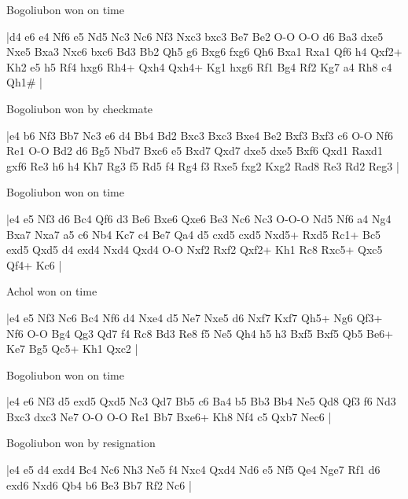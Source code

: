 Bogoliubon won on time

\makegametitle
|d4 e6 e4 Nf6 e5 Nd5 Nc3 Nc6 Nf3 Nxc3 bxc3 Be7 Be2 O-O O-O d6 Ba3 dxe5 Nxe5 Bxa3 Nxc6 bxc6 Bd3 Bb2 Qh5 g6 Bxg6 fxg6 Qh6 Bxa1 Rxa1 Qf6 h4 Qxf2+ Kh2 e5 h5 Rf4 hxg6 Rh4+ Qxh4 Qxh4+ Kg1 hxg6 Rf1 Bg4 Rf2 Kg7 a4 Rh8 c4 Qh1\#  |

\showboard

Bogoliubon won by checkmate

\makegametitle
|e4 b6 Nf3 Bb7 Nc3 e6 d4 Bb4 Bd2 Bxc3 Bxc3 Bxe4 Be2 Bxf3 Bxf3 c6 O-O Nf6 Re1 O-O Bd2 d6 Bg5 Nbd7 Bxc6 e5 Bxd7 Qxd7 dxe5 dxe5 Bxf6 Qxd1 Raxd1 gxf6 Re3 h6 h4 Kh7 Rg3 f5 Rd5 f4 Rg4 f3 Rxe5 fxg2 Kxg2 Rad8 Re3 Rd2 Reg3  |

\showboard

Bogoliubon won on time

\makegametitle
|e4 e5 Nf3 d6 Bc4 Qf6 d3 Be6 Bxe6 Qxe6 Be3 Nc6 Nc3 O-O-O Nd5 Nf6 a4 Ng4 Bxa7 Nxa7 a5 c6 Nb4 Kc7 c4 Be7 Qa4 d5 cxd5 cxd5 Nxd5+ Rxd5 Rc1+ Bc5 exd5 Qxd5 d4 exd4 Nxd4 Qxd4 O-O Nxf2 Rxf2 Qxf2+ Kh1 Rc8 Rxc5+ Qxc5 Qf4+ Kc6  |

\showboard

Achol won on time

\makegametitle
|e4 e5 Nf3 Nc6 Bc4 Nf6 d4 Nxe4 d5 Ne7 Nxe5 d6 Nxf7 Kxf7 Qh5+ Ng6 Qf3+ Nf6 O-O Bg4 Qg3 Qd7 f4 Rc8 Bd3 Re8 f5 Ne5 Qh4 h5 h3 Bxf5 Bxf5 Qb5 Be6+ Ke7 Bg5 Qc5+ Kh1 Qxc2  |

\showboard

Bogoliubon won on time

\makegametitle
|e4 e6 Nf3 d5 exd5 Qxd5 Nc3 Qd7 Bb5 c6 Ba4 b5 Bb3 Bb4 Ne5 Qd8 Qf3 f6 Nd3 Bxc3 dxc3 Ne7 O-O O-O Re1 Bb7 Bxe6+ Kh8 Nf4 c5 Qxb7 Nec6  |

\showboard

Bogoliubon won by resignation

\makegametitle
|e4 e5 d4 exd4 Bc4 Nc6 Nh3 Ne5 f4 Nxc4 Qxd4 Nd6 e5 Nf5 Qe4 Nge7 Rf1 d6 exd6 Nxd6 Qb4 b6 Be3 Bb7 Rf2 Nc6  |

\showboard


